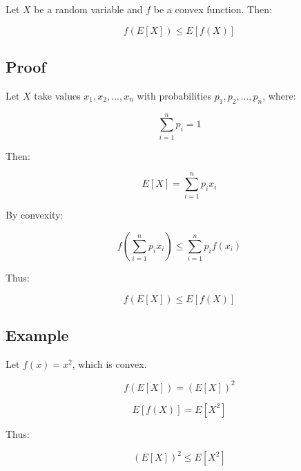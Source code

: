 \documentclass[12pt]{article}
\begin{document}
Let $X$ be a random variable and $f$ be a convex function. Then:

\[
f(E[X]) \le E[f(X)]
\]

\subsection*{Proof}

Let $X$ take values $x_1, x_2, \ldots, x_n$ with probabilities $p_1, p_2, \ldots, p_n$, where:

\[
\sum_{i=1}^n p_i = 1
\]

Then:

\[
E[X] = \sum_{i=1}^n p_i x_i
\]

By convexity:

\[
f\left(\sum_{i=1}^n p_i x_i\right) \le \sum_{i=1}^n p_i f(x_i)
\]

Thus:

\[
f(E[X]) \le E[f(X)]
\]

\subsection*{Example}

Let $f(x) = x^2$, which is convex.

\[
f(E[X]) = (E[X])^2
\]

\[
E[f(X)] = E[X^2]
\]

Thus:

\[
(E[X])^2 \le E[X^2]
\]
\end{document}
